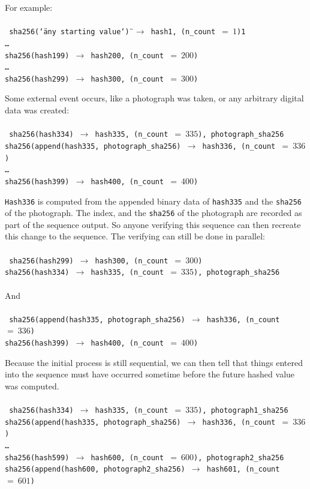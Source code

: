 \documentclass[12pt]{article}
\begin{document}
\noindent For example:\\\\\noindent
\texttt{
sha256(\char`\"any starting value\char`\") $\rightarrow$ hash1,
(n\_count $=~1$)1\\
\ldots\\
sha256(hash199) $\rightarrow$ hash200, (n\_count $=~200$)\\
\ldots\\
sha256(hash299) $\rightarrow$ hash300, (n\_count $=~300$)\\
}

\noindent Some external event occurs, like a photograph was taken, or
any arbitrary digital data was created:\\\\\noindent
\texttt{
  sha256(hash334) $\rightarrow$ hash335, (n\_count $=~335$), photograph\_sha256\\
  sha256(append(hash335, photograph\_sha256) $\rightarrow$ hash336,
  (n\_count $=~336$)\\
  \ldots\\
  sha256(hash399) $\rightarrow$ hash400, (n\_count $=~400$)\\
}

\texttt{Hash336} is computed from the appended binary data of
\texttt{hash335} and the \texttt{sha256} of the photograph. The index,
and the \texttt{sha256} of the photograph are recorded as part of the
sequence output. So anyone verifying this sequence can then recreate
this change to the sequence. The verifying can still be done in
parallel:\\\\\noindent
\texttt{
  sha256(hash299) $\rightarrow$ hash300, (n\_count $=~300$)\\
  sha256(hash334) $\rightarrow$ hash335, (n\_count $=~335$), photograph\_sha256\\
}\\\noindent
And\\\\\noindent
\texttt{
  sha256(append(hash335, photograph\_sha256) $\rightarrow$ hash336,
  (n\_count $=~336$)\\
  sha256(hash399) $\rightarrow$ hash400, (n\_count $=~400$)\\
}

Because the initial process is still sequential, we can then tell that things entered into the sequence must have occurred sometime before the future hashed value was computed.\\\\\noindent
\texttt{
sha256(hash334) $\rightarrow$ hash335, (n\_count $=~335$), photograph1\_sha256\\
sha256(append(hash335, photograph\_sha256) $\rightarrow$ hash336,
(n\_count $=~336$)\\
\ldots\\
sha256(hash599) $\rightarrow$ hash600, (n\_count $=~600$), photograph2\_sha256
sha256(append(hash600, photograph2\_sha256) $\rightarrow$ hash601,
(n\_count $=~601$)\\
}
\end{document}
